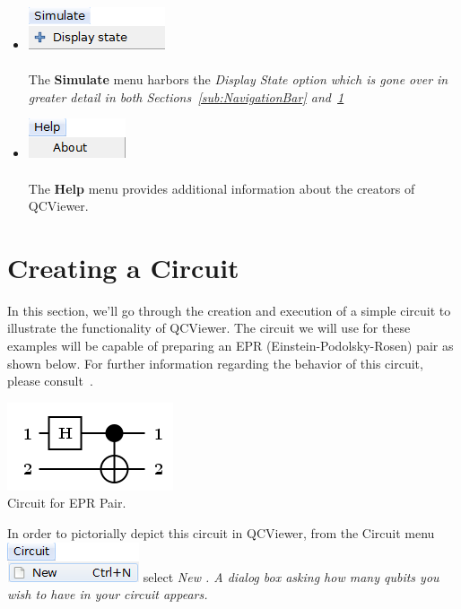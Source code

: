 \documentclass[10pt]{article}
\theoremstyle{definition}
\begin{document}
\begin{itemize}
\item \includegraphics{Figures/Menu/Simulate.png} \\ \\
The {\bf Simulate} menu harbors the \em Display State \em option which is gone over in greater detail in both Sections~\ref{sub:NavigationBar} and~\ref{sec:CreatingaCircuit}


\item \includegraphics{Figures/Menu/Help.png} \\ \\
The {\bf Help} menu provides additional information about the creators of QCViewer. 

\end{itemize}

\section{Creating a Circuit} \label{sec:CreatingaCircuit}
In this section, we'll go through the creation and execution of a simple circuit to illustrate the functionality of QCViewer. The circuit we will use for these examples will be capable of preparing an EPR (Einstein-Podolsky-Rosen) pair as shown below. For further information regarding the behavior of this circuit, please consult~\cite{Nielsen2002Quantum}.

\begin{center}
\includegraphics[scale=.7]{Figures/CreateCircuit/EPRCircuit}\\
Circuit for EPR Pair.
\end{center}

In order to pictorially depict this circuit in QCViewer, from the Circuit menu \includegraphics{Figures/CreateCircuit/New.png} select \em New \em. A dialog box asking how many qubits you wish to have in your circuit appears. 
\end{document}
